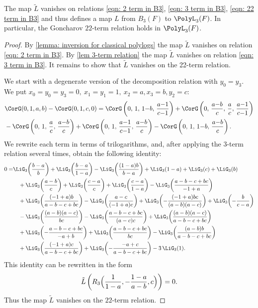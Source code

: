 \documentclass[a4paper]{amsart}
\begin{document}
\begin{lemma}The map   $\tilde{L}$ vanishes on relations \eqref{eqn: 2 term in B3}, \eqref{eqn: 3 term in B3}, \eqref{eqn: 22 term in B3} and thus defines a map $L$ from $B_3(F)$ to $\PolyL_3(F)$. In particular, the Goncharov $22$-term relation holds in $\PolyL_3(F)$.
\end{lemma}
\begin{proof}
By \cref{lemma: inversion for classical polylogs} the map $\tilde{L}$ vanishes on relation \eqref{eqn: 2 term in B3}. By \cref{lem 3-term relation} the map $\tilde{L}$ vanishes on relation \eqref{eqn: 3 term in B3}. It remains to show that $\tilde{L}$ vanishes on the 22-term relation. 

We start with a degenerate version of the decomposition relation with $y_0=y_3$. We put $x_0=y_0=y_3=0, \: x_1=y_1=1, \: x_2=a, x_3=b, y_2=c$:
\begin{align*}
&\CorG(0,1,a,b) - \CorG(0,1,c,0) = 
\CorG\left(0,\,1,\,1{-}b,\,\frac{a{-}1}{c{-}1}\right)  + \CorG\left(0,\,\frac{a{-}b}{c},\,\frac{a}{c},\,\frac{a{-}1}{c{-}1}\right) \\
&- \CorG\left(0,\,1,\,\frac{a}{c},\,\frac{a{-}b}{c}\right)  + \CorG\left(0,\,1,\,\frac{a{-}1}{c{-}1},\,\frac{a{-}b}{c}\right) - \CorG\left(0,\,1,\,1{-}b,\,\frac{a{-}b}{c}\right).
\end{align*}
We rewrite each term in terms of trilogarithms, and, after applying the $3$-term relation several times, obtain the following identity:
\begin{align*}
0=&\LiG_3\!\left(\frac{b-a}{b}\right)
+ \LiG_3\!\left(\frac{b-a}{1-a}\right)
- \LiG_3\!\left(\frac{(1-a)b}{b-a}\right)
+ \LiG_3(1-a)
+ \LiG_3(c)
+ \LiG_3(b)\\
&\quad
+ \LiG_3\!\left(\frac{a-b}{c}\right)
+ \LiG_3\!\left(\frac{c-a}{c}\right)
+ \LiG_3\!\left(\frac{c-a}{1-a}\right)
- \LiG_3\!\left(\frac{a-b-c+bc}{-1+a}\right) \\
&\quad
+ \LiG_3\!\left(\frac{(-1+a)b}{a-b-c+bc}\right)
- \LiG_3\!\left(\frac{a-c}{(-1+a)c}\right)
+ \LiG_3\!\left(-\frac{(-1+a) b c}{(a-b)(a-c)}\right)
+ \LiG_3\!\left(-\frac{b}{c-a}\right) \\
&\quad
- \LiG_3\!\left(\frac{(a-b)(a-c)}{b c}\right)
- \LiG_3\!\left(\frac{a-b-c+bc}{(a-c)c}\right)
+ \LiG_3\!\left(\frac{(a-b)(a-c)}{a-b-c+bc}\right) \\
&\quad
+ \LiG_3\!\left(-\frac{a-b-c+bc}{-a+b}\right)
+ \LiG_3\!\left(\frac{a-b-c+bc}{b c}\right)
- \LiG_3\!\left(\frac{(a-b)b}{a-b-c+bc}\right) \\
&\quad
+ \LiG_3\!\left(\frac{(-1+a)c}{a-b-c+bc}\right)
+ \LiG_3\!\left(-\frac{-a+c}{a-b-c+bc}\right)- 3\,\LiG_3(1) .
\end{align*}
This identity can be rewritten in the form
\[
\tilde{L}\left(R_3\Bigl(\frac{1}{1-a},-\frac{1-a}{a-b},c\Bigr)\right)=0.
\]
Thus the map $\tilde{L}$ vanishes on the $22$-term relation.
\end{proof}
\end{document}
